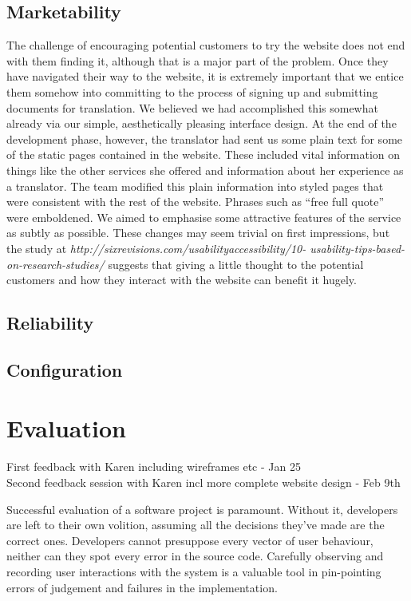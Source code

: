 \documentclass{l3proj}
\begin{document}
\section{Marketability}
The challenge of encouraging potential customers to try the website does not end with them finding it, although 
that is a major part of the problem. Once they have navigated their way to the website, it is extremely important 
that we entice them somehow into committing to the process of signing up and submitting documents for translation.
We believed we had accomplished this somewhat already via our simple, aesthetically pleasing interface design.
At the end of the development phase, however, the translator had sent us some plain text for some of the static 
pages contained in the website. These included vital information on things like the other services she offered
and information about her experience as a translator. The team modified this plain information into styled pages
that were consistent with the rest of the website. Phrases such as ``free full quote'' were emboldened. We 
aimed to emphasise some attractive features of the service as subtly as possible. These changes may seem 
trivial on first impressions, but the study at \small{\textit{http://sixrevisions.com/usabilityaccessibility/10-
usability-tips-based-on-research-studies/}} suggests that giving a little thought to the potential customers
and how they interact with the website can benefit it hugely.
\section{Reliability}
\section{Configuration}


\chapter{Evaluation}
\label{chap:eval}
First feedback with Karen including wireframes etc - Jan 25\\
Second feedback session with Karen incl more complete website design - Feb 9th

Successful evaluation of a software project is paramount. Without it,
developers are left to their own volition, assuming all the decisions they've
made are the correct ones. Developers cannot presuppose every vector of user
behaviour, neither can they spot every error in the source code. Carefully
observing and recording user interactions with the system is a valuable tool
in pin-pointing errors of judgement and failures in the implementation.
\end{document}
